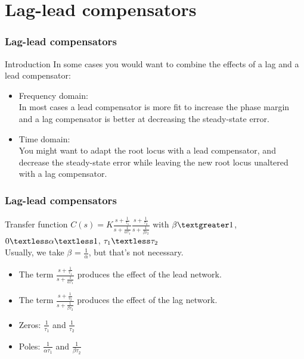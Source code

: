 \section{Lag-lead compensators}

\begin{frame}
\frametitle{Lag-lead compensators}
\begin{block}{Introduction}
	In some cases you would want to combine the effects of a lag and a lead compensator:
	\begin{itemize}
		\item Frequency domain: \\
		In most cases a lead compensator is more fit to increase the phase margin and a lag compensator is better at 	decreasing the steady-state error.
		\item Time domain: \\
		You might want to adapt the root locus with a lead compensator, and decrease the steady-state error while leaving the new root locus unaltered with a lag 	compensator.	
	\end{itemize}
\end{block}
\end{frame}

\begin{frame}
\frametitle{Lag-lead compensators}
\begin{block}{Transfer function}
	$C(s) = K\frac{s + \frac{1}{\tau_1}}{s + \frac{1}{\alpha\tau_1}}\frac{s + \frac{1}{\tau_2}}{s + \frac{1}{\beta\tau_2}}$ with $\beta \textgreater 1$, $0 \textless \alpha \textless 1$, $\tau_1 \textless \tau_2$ \\
	Usually, we take $\beta$ = $\frac{1}{\alpha}$, but that's not necessary. \\
	\begin{itemize}
	\item The term $\frac{s + \frac{1}{\tau_1}}{s + \frac{1}{\alpha\tau_1}}$ produces the effect of the lead network.
	\item The term $\frac{s + \frac{1}{\tau_2}}{s + \frac{1}{\beta\tau_2}}$ produces the effect of the lag network.
	\item Zeros: $\frac{1}{\tau_1}$ and $\frac{1}{\tau_2}$
	\item Poles: $\frac{1}{\alpha \tau_1}$ and $\frac{1}{\beta \tau_2}$
	\end{itemize}
\end{block}

\end{frame}

